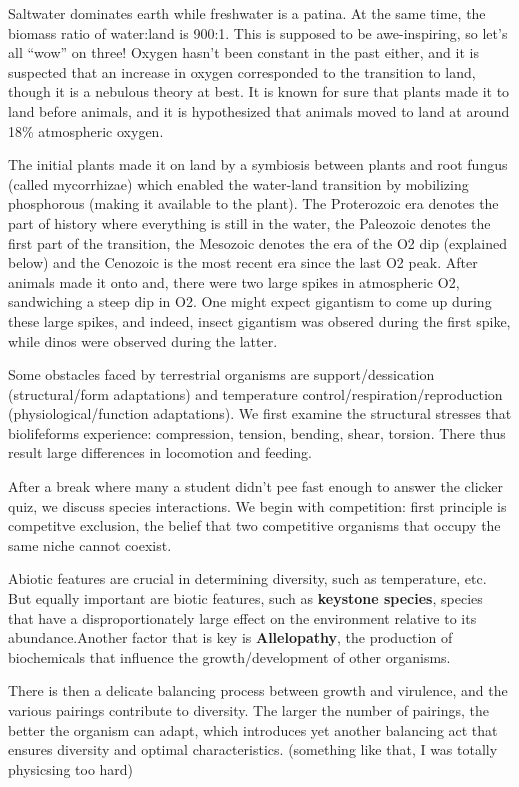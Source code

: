 \documentclass[12pt]{article}
\begin{document}
Saltwater dominates earth while freshwater is a patina. At the same time, the biomass ratio of water:land is 900:1. This is supposed to be awe-inspiring, so let's all ``wow'' on three! Oxygen hasn't been constant in the past either, and it is suspected that an increase in oxygen corresponded to the transition to land, though it is a nebulous theory at best. It is known for sure that plants made it to land before animals, and it is hypothesized that animals moved to land at around 18\% atmospheric oxygen.

The initial plants made it on land by a symbiosis between plants and root fungus (called mycorrhizae) which enabled the water-land transition by mobilizing phosphorous (making it available to the plant). The Proterozoic era denotes the part of history where everything is still in the water, the Paleozoic denotes the first part of the transition, the Mesozoic denotes the era of the O2 dip (explained below) and the Cenozoic is the most recent era since the last O2 peak. After animals made it onto and, there were two large spikes in atmospheric O2, sandwiching a steep dip in O2. One might expect gigantism to come up during these large spikes, and indeed, insect gigantism was obsered during the first spike, while dinos were observed during the latter.

Some obstacles faced by terrestrial organisms are support/dessication (structural/form adaptations) and temperature control/respiration/reproduction (physiological/function adaptations). We first examine the structural stresses that biolifeforms experience: compression, tension, bending, shear, torsion. There thus result large differences in locomotion and feeding.

After a break where many a student didn't pee fast enough to answer the clicker quiz, we discuss species interactions. We begin with competition: first principle is competitve exclusion, the belief that two competitive organisms that occupy the same niche cannot coexist.

Abiotic features are crucial in determining diversity, such as temperature, etc. But equally important are biotic features, such as \textbf{keystone species}, species that have a disproportionately large effect on the environment relative to its abundance.Another factor that is key is \textbf{Allelopathy}, the production of biochemicals that influence the growth/development of other organisms. 

There is then a delicate balancing process between growth and virulence, and the various pairings contribute to diversity. The larger the number of pairings, the better the organism can adapt, which introduces yet another balancing act that ensures diversity and optimal characteristics. (something like that, I was totally physicsing too hard)
\end{document}
